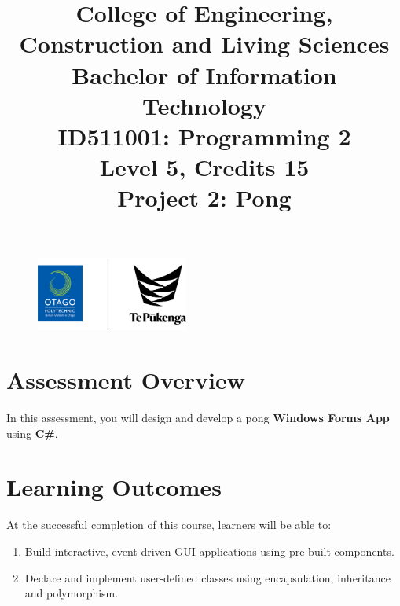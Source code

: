 \documentclass{article}
\author{}
\begin{document}
\begin{figure}
    \centering
    \includegraphics[width=50mm]{../../resources/img/logo.png}
\end{figure}

\title{College of Engineering, Construction and Living Sciences\\Bachelor of Information Technology\\ID511001: Programming 2\\Level 5, Credits 15\\\textbf{Project 2: Pong}}
\date{}
\maketitle

\section*{Assessment Overview}
In this assessment, you will design and develop a pong \textbf{Windows Forms App} using \textbf{C\#}.

\section*{Learning Outcomes}
At the successful completion of this course, learners will be able to:
\begin{enumerate}
    \item Build interactive, event-driven GUI applications using pre-built components.
    \item Declare and implement user-defined classes using encapsulation, inheritance and polymorphism.
\end{enumerate} 
\end{document}
